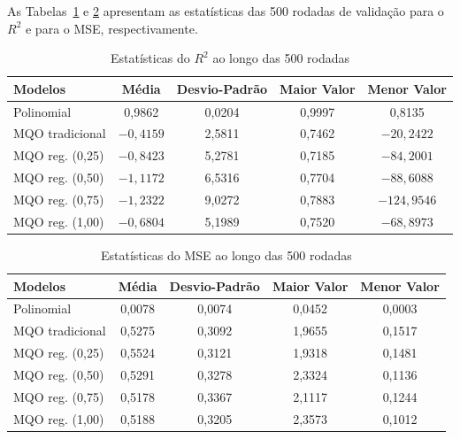 \documentclass[conference]{IEEEtran}
\begin{document}
As Tabelas~\ref{tab:r2} e \ref{tab:mse} apresentam as estatísticas das 500
rodadas de validação para o $R^2$ e para o MSE, respectivamente.

\begin{table}[htbp]
\caption{Estatísticas do $R^2$ ao longo das 500 rodadas}
\begin{center}
\begin{tabular}{|l|c|c|c|c|}
\hline
\textbf{Modelos} & \textbf{Média} & \textbf{Desvio-Padrão} & \textbf{Maior Valor} & \textbf{Menor Valor} \\
\hline
Polinomial & 0,9862 & 0,0204 & 0,9997 & 0,8135 \\
\hline
MQO tradicional & $-0{,}4159$ & 2,5811 & 0,7462 & $-20{,}2422$ \\
\hline
MQO reg. (0,25) & $-0{,}8423$ & 5,2781 & 0,7185 & $-84{,}2001$ \\
\hline
MQO reg. (0,50) & $-1{,}1172$ & 6,5316 & 0,7704 & $-88{,}6088$ \\
\hline
MQO reg. (0,75) & $-1{,}2322$ & 9,0272 & 0,7883 & $-124{,}9546$ \\
\hline
MQO reg. (1,00) & $-0{,}6804$ & 5,1989 & 0,7520 & $-68{,}8973$ \\
\hline
\end{tabular}
\label{tab:r2}
\end{center}
\end{table}

\begin{table}[htbp]
\caption{Estatísticas do MSE ao longo das 500 rodadas}
\begin{center}
\begin{tabular}{|l|c|c|c|c|}
\hline
\textbf{Modelos} & \textbf{Média} & \textbf{Desvio-Padrão} & \textbf{Maior Valor} & \textbf{Menor Valor} \\
\hline
Polinomial & 0,0078 & 0,0074 & 0,0452 & 0,0003 \\
\hline
MQO tradicional & 0,5275 & 0,3092 & 1,9655 & 0,1517 \\
\hline
MQO reg. (0,25) & 0,5524 & 0,3121 & 1,9318 & 0,1481 \\
\hline
MQO reg. (0,50) & 0,5291 & 0,3278 & 2,3324 & 0,1136 \\
\hline
MQO reg. (0,75) & 0,5178 & 0,3367 & 2,1117 & 0,1244 \\
\hline
MQO reg. (1,00) & 0,5188 & 0,3205 & 2,3573 & 0,1012 \\
\hline
\end{tabular}
\label{tab:mse}
\end{center}
\end{table}
\end{document}
